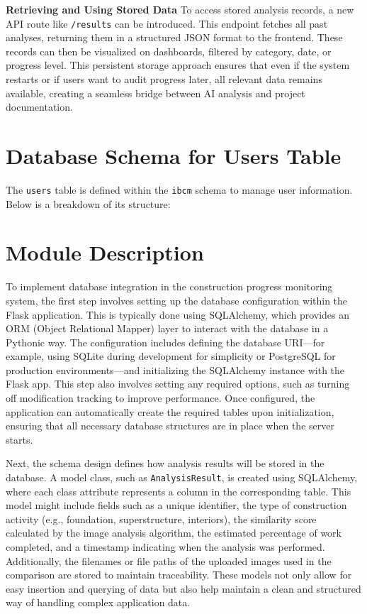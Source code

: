 \documentclass[12pt,a4paper]{report}
\begin{document}
\textbf{Retrieving and Using Stored Data}
To access stored analysis records, a new API route like \texttt{/results} can be introduced. This endpoint fetches all past analyses, returning them in a structured JSON format to the frontend. These records can then be visualized on dashboards, filtered by category, date, or progress level. This persistent storage approach ensures that even if the system restarts or if users want to audit progress later, all relevant data remains available, creating a seamless bridge between AI analysis and project documentation.

\section{Database Schema for Users Table}
The \texttt{users} table is defined within the \texttt{ibcm} schema to manage user information. Below is a breakdown of its structure:


\section{Module Description}
To implement database integration in the construction progress monitoring system, the first step involves setting up the database configuration within the Flask application. This is typically done using SQLAlchemy, which provides an ORM (Object Relational Mapper) layer to interact with the database in a Pythonic way. The configuration includes defining the database URI—for example, using SQLite during development for simplicity or PostgreSQL for production environments—and initializing the SQLAlchemy instance with the Flask app. This step also involves setting any required options, such as turning off modification tracking to improve performance. Once configured, the application can automatically create the required tables upon initialization, ensuring that all necessary database structures are in place when the server starts.

Next, the schema design defines how analysis results will be stored in the database. A model class, such as \texttt{AnalysisResult}, is created using SQLAlchemy, where each class attribute represents a column in the corresponding table. This model might include fields such as a unique identifier, the type of construction activity (e.g., foundation, superstructure, interiors), the similarity score calculated by the image analysis algorithm, the estimated percentage of work completed, and a timestamp indicating when the analysis was performed. Additionally, the filenames or file paths of the uploaded images used in the comparison are stored to maintain traceability. These models not only allow for easy insertion and querying of data but also help maintain a clean and structured way of handling complex application data.
\end{document}
